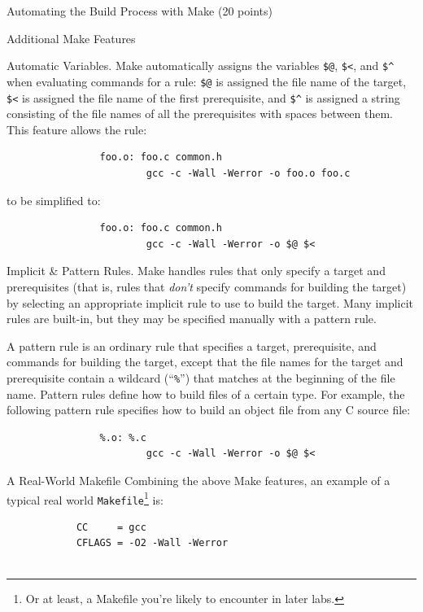 \documentclass{article}
\begin{document}
\begin{section}{Automating the Build Process with Make (20 points)}
\begin{subsection}{Additional Make Features}
			\begin{paragraph}{Automatic Variables.}
				Make automatically assigns the variables \texttt{\$@}, \texttt{\$<}, and
				\texttt{\$\^} when evaluating commands for a rule: \texttt{\$@} is assigned
				the file name of the target, \texttt{\$<} is assigned the file name of the
				first prerequisite, and \texttt{\$\^} is assigned a string consisting of
				the file names of all the prerequisites with spaces between them.  This
				feature allows the rule:
				\begin{verbatim}
				foo.o: foo.c common.h
				        gcc -c -Wall -Werror -o foo.o foo.c
				\end{verbatim}
				to be simplified to:
				\begin{verbatim}
				foo.o: foo.c common.h
				        gcc -c -Wall -Werror -o $@ $<
				\end{verbatim}
			\end{paragraph}

			\begin{paragraph}{Implicit \& Pattern Rules.}
				Make handles rules that only specify a target and prerequisites (that is,
				rules that \emph{don't} specify commands for building the target) by
				selecting an appropriate implicit rule to use to build the target.  Many
				implicit rules are built-in, but they may be specified manually with a
				pattern rule.

				A pattern rule is an ordinary rule that specifies a target, prerequisite,
				and commands for building the target, except that the file names for the
				target and prerequisite contain a wildcard (``\texttt{\%}'') that matches
				at the beginning of the file name.  Pattern rules define how to build files
				of a certain type.  For example, the following pattern rule specifies how
				to build an object file from any C source file:
				\begin{verbatim}
				%.o: %.c
				        gcc -c -Wall -Werror -o $@ $<
				\end{verbatim}
			\end{paragraph}
		\end{subsection}

		\begin{subsection}{A Real-World Makefile}
			Combining the above Make features, an example of a typical real world
			\texttt{Makefile}\footnote{Or at least, a Makefile you're likely to
			encounter in later labs.} is:
			\begin{verbatim}
			CC     = gcc
			CFLAGS = -O2 -Wall -Werror


\end{verbatim}
\end{subsection}
\end{section}
\end{document}
